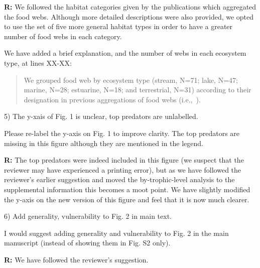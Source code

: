 \documentclass[12pt]{letter}
\newenvironment{refquote}{\bigskip \begin{it}}{\end{it}\smallskip}
\begin{document}
  \textbf{R:} We followed the habitat categories given by the publications which
  aggregated the food webs. Although more detailed descriptions were also provided, 
  we opted to use the set of five more general habitat types in order to have a 
  greater number of food webs in each category.


  We have added a brief explanation, and the number of webs in each ecosystem type, at lines XX-XX:

  \begin{quotation}
    We grouped food web by ecosystem type (stream, N=71; lake, N=47; marine, N=28; estuarine, N=18;
    and terrestrial, N=31) according to their designation in previous aggregations of food webs 
    (i.e.,~\citet{GlobalWeb,Riede2011,Dunne2013}).
    
  \end{quotation}


  5) The y-xais of Fig. 1 is unclear, top predators are unlabelled.


  \begin{refquote}

    Please re-label the y-axis on Fig. 1 to improve clarity. The top predators
    are missing in this figure although they are mentioned in the legend.

  \end{refquote}


  \textbf{R:} The top predators were indeed included in this figure (we suspect that the reviewer
  may have experienced a printing error), but as we have followed the reviewer's earlier
  suggestion and moved the by-trophic-level analysis to the supplemental information this becomes
  a moot point. We have slightly modified the y-axis on the new version of this figure and feel that
  it is now much clearer.


  6) Add generality, vulnerability to Fig. 2 in main text.


  \begin{refquote}

    I would suggest adding generality and vulnerability to Fig. 2 in the main
    manuscript (instead of showing them in Fig. S2 only).

  \end{refquote}


  \textbf{R:} We have followed the reviewer's suggestion.


  \newpage



\end{document}
